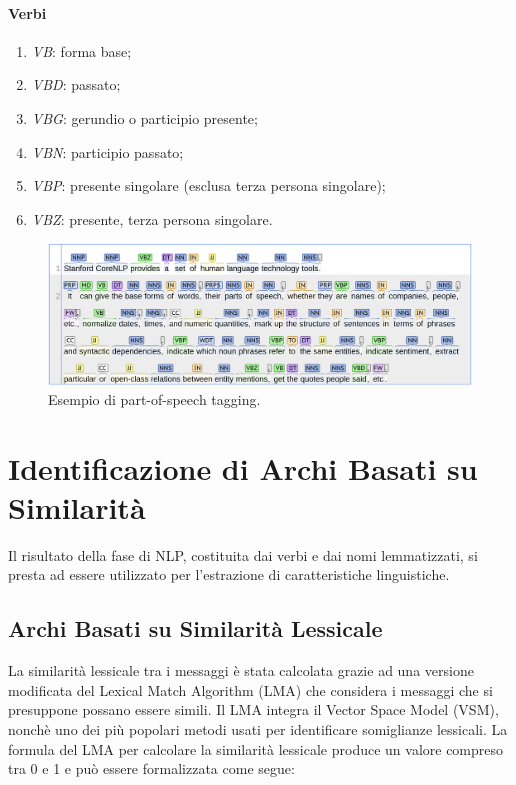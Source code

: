 \paragraph{Verbi}

\begin{enumerate}[label=(\roman*)]
  
\item \textit{VB}: forma base;
\item \textit{VBD}: passato;
\item \textit{VBG}: gerundio o participio presente;
\item \textit{VBN}: participio passato;
\item \textit{VBP}: presente singolare (esclusa terza persona singolare);
\item \textit{VBZ}: presente, terza persona singolare.

\end{enumerate}

\begin{figure}\centering
\includegraphics[scale=0.20]{img/pos}
\caption{Esempio di part-of-speech tagging.}
\end{figure}

\section{Identificazione di Archi Basati su Similarit{\`a}}
Il risultato della fase di NLP, costituita dai verbi e dai nomi lemmatizzati, si presta ad essere utilizzato per l'estrazione di caratteristiche linguistiche.

\subsection{Archi Basati su Similarit{\`a} Lessicale}
La similarit{\`a} lessicale tra i messaggi {\`e} stata calcolata grazie ad una versione modificata del Lexical Match Algorithm (LMA) \cite{hic} che considera i messaggi che si presuppone possano essere simili. Il LMA integra il Vector Space Model (VSM), nonch{\`e} uno dei pi{\`u} popolari metodi usati per identificare somiglianze lessicali. La formula del LMA per calcolare la similarit{\`a} lessicale produce un valore compreso tra 0 e 1 e pu{\`o} essere formalizzata come segue:

